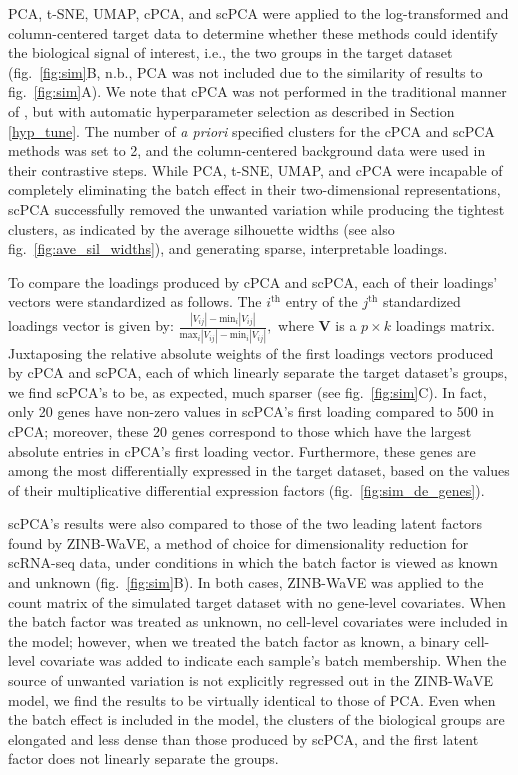 PCA, t-SNE, UMAP, cPCA, and scPCA were applied to the log-transformed and column-centered target data to determine whether these methods could identify the biological signal of interest, i.e., the two groups in the target dataset (fig.~\ref{fig:sim}B, n.b., PCA was not included due to the similarity of results to fig.~\ref{fig:sim}A). We note that cPCA was not performed in the traditional manner of \citet{Abid2018}, but with automatic hyperparameter selection as described in Section \ref{hyp_tune}. The number of \textit{a priori} specified clusters for the cPCA and scPCA methods was set to 2, and the column-centered background data were used in their contrastive steps. While PCA, t-SNE, UMAP, and cPCA were incapable of completely eliminating the batch effect in their two-dimensional representations, scPCA successfully removed the unwanted variation while producing the tightest clusters, as indicated by the average silhouette widths (see also fig.~\ref{fig:ave_sil_widths}), and generating sparse, interpretable loadings.

To compare the loadings produced by cPCA and scPCA, each of their loadings' vectors were standardized as follows. The $i^{\text{th}}$ entry of the $j^{\text{th}}$ standardized loadings vector is given by: 
$
\frac{|V_{ij}| - \text{min}_i |V_{ij}|}{\text{max}_i |V_{ij}| - \text{min}_i |V_{ij}|},
$
where $\mathbf{V}$ is a $p \times k$ loadings matrix. 
Juxtaposing the relative absolute weights of the first loadings vectors produced by cPCA and scPCA, each of which linearly separate the target dataset's groups, we find scPCA's to be, as expected, much sparser (see fig.~\ref{fig:sim}C). In fact, only 20 genes have non-zero values in scPCA's first loading compared to 500 in cPCA; moreover, these 20 genes correspond to those which have the largest absolute entries in cPCA's first loading vector. Furthermore, these genes are among the most differentially expressed in the target dataset, based on the values of their multiplicative differential expression factors (fig.~\ref{fig:sim_de_genes}).

scPCA's results were also compared to those of the two leading latent factors found by ZINB-WaVE, a method of choice for dimensionality reduction for scRNA-seq data, under conditions in which the batch factor is viewed as known and unknown (fig.~\ref{fig:sim}B). In both cases, ZINB-WaVE was applied to the count matrix of the simulated target dataset with no gene-level covariates. When the batch factor was treated as unknown, no cell-level covariates were included in the model; however, when we treated the batch factor as known, a binary cell-level covariate was added to indicate each sample's batch membership. When the source of unwanted variation is not explicitly regressed out in the ZINB-WaVE model, we find the results to be virtually identical to those of PCA. Even when the batch effect is included in the model, the clusters of the biological groups are elongated and less dense than those produced by scPCA, and the first latent factor does not linearly separate the groups.

